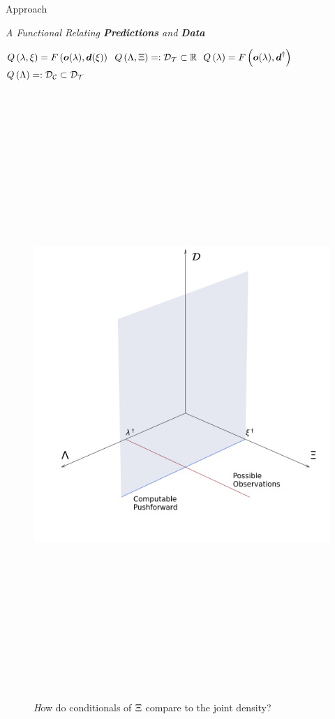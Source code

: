 \begin{block}{Approach}
\centering

\centering
\vspace{1cm}
    \emph{\large A Functional Relating \textbf{Predictions} and \textbf{Data}}
    \large
    \begin{itemize}
        $Q \left (\operatorname*{\lambda}, \operatorname*{\xi} \right ) = F \left ( \boldsymbol{o}(\operatorname*{\lambda}), \boldsymbol{d}(\operatorname*{\xi}) \right )$
        $Q \left ( \Lambda, \operatorname*{\Xi} \right ) =: \mathcal{D}_\mathcal{T} \subset \mathbb{R}$
        $Q \left (\operatorname*{\lambda} \right ) = F \left ( \boldsymbol{o}(\operatorname*{\lambda}), \boldsymbol{d}^\dagger \right )$
        $Q \left ( \Lambda \right ) =: \mathcal{D}_\mathcal{C} \subset \mathcal{D}_\mathcal{T}$
    \end{itemize}
    \begin{figure}
        \includegraphics[height=23cm]{figures/diagram}
    \caption{\large \emph How do conditionals of $\operatorname*{\Xi}$ compare to the joint density?}
    \end{figure}



\end{block}
